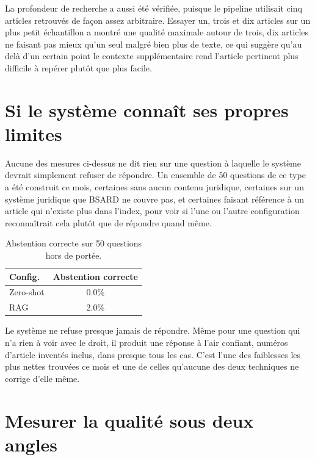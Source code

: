 \documentclass[11pt, a4paper]{article}
\begin{document}
La profondeur de recherche a aussi \'et\'e v\'erifi\'ee, puisque le pipeline utilisait cinq articles retrouv\'es de fa\c{c}on assez arbitraire. Essayer un, trois et dix articles sur un plus petit \'echantillon a montr\'e une qualit\'e maximale autour de trois, dix articles ne faisant pas mieux qu'un seul malgr\'e bien plus de texte, ce qui sugg\`ere qu'au del\`a d'un certain point le contexte suppl\'ementaire rend l'article pertinent plus difficile \`a rep\'erer plut\^ot que plus facile.

\section{Si le syst\`eme conna\^it ses propres limites}

Aucune des mesures ci-dessus ne dit rien sur une question \`a laquelle le syst\`eme devrait simplement refuser de r\'epondre. Un ensemble de 50 questions de ce type a \'et\'e construit ce mois, certaines sans aucun contenu juridique, certaines sur un syst\`eme juridique que BSARD ne couvre pas, et certaines faisant r\'ef\'erence \`a un article qui n'existe plus dans l'index, pour voir si l'une ou l'autre configuration reconna\^itrait cela plut\^ot que de r\'epondre quand m\^eme.

\begin{table}[H]
\centering
\small
\begin{tabular}{lc}
\toprule
\textbf{Config.} & \textbf{Abstention correcte} \\
\midrule
Zero-shot & 0.0\% \\
RAG & 2.0\% \\
\bottomrule
\end{tabular}
\caption{Abstention correcte sur 50 questions hors de port\'ee.}
\label{tab:abstention}
\end{table}

Le syst\`eme ne refuse presque jamais de r\'epondre. M\^eme pour une question qui n'a rien \`a voir avec le droit, il produit une r\'eponse \`a l'air confiant, num\'eros d'article invent\'es inclus, dans presque tous les cas. C'est l'une des faiblesses les plus nettes trouv\'ees ce mois et une de celles qu'aucune des deux techniques ne corrige d'elle m\^eme.

\section{Mesurer la qualit\'e sous deux angles}
\end{document}
